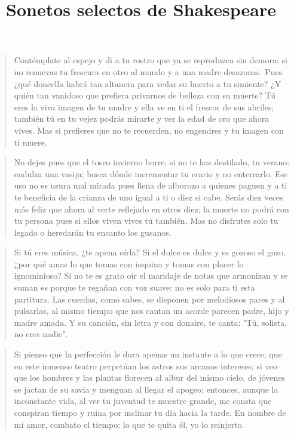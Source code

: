 \documentclass[12pt]{article}
\date{}
\title{Sonetos selectos de Shakespeare}
\begin{document}
\maketitle
\tableofcontents

\clearpage
{}
\begin{verse}
Contémplate al espejo y di a tu rostro  
que ya se reproduzca sin demora;  
si no renuevas tu frescura en otro  
al mundo y a una madre desazonas.  
Pues ¿qué doncella habrá tan altanera  
para vedar su huerto a tu simiente?  
¿Y quién tan vanidoso que prefiera  
privarnos de belleza con su muerte?  
Tú eres la viva imagen de tu madre  
y ella ve en ti el frescor de sus abriles;  
también tú en tu vejez podrás mirarte  
y ver la edad de oro que ahora vives.  
Mas si prefieres que no te recuerden,  
no engendres y tu imagen con ti muere.

\end{verse}

\clearpage
{}
\begin{verse}
No dejes pues que el tosco invierno borre,  
si no te has destilado, tu verano:  
endulza una vasija; busca dónde  
incrementar tu erario y no enterrarlo.  
Ese uso no es usura mal mirada  
pues llena de alborozo a quienes paguen  
y a ti te beneficia de la crianza  
de uno igual a ti o diez si cabe.   
Serás diez veces más feliz que ahora  
al verte reflejado en otros diez;  
la muerte no podrá con tu persona  
pues si ellos viven vives tú también.   
Mas no disfrutes solo tu legado  
o heredarán tu encanto los gusanos. 

\end{verse}

\clearpage
{}
\begin{verse}
Si tú eres música, ¿te apena oírla?  
Si el dulce es dulce y es gozoso el gozo,  
¿por qué amas lo que tomas con inquina  
y tomas con placer lo ignominioso?  
Si no te es grato oír el maridaje  
de notas que armonizan y se suman  
es porque te regañan con voz suave:  
no es solo para ti esta partitura.  
Las cuerdas, como sabes, se disponen  
por melodiosos pares y al pulsarlas,  
al mismo tiempo que nos cantan un acorde  
parecen padre, hijo y madre amada.  
Y su canción, sin letra y con donaire,  
te canta: "Tú, solista, no eres nadie".

\end{verse}

\clearpage
{}
\begin{verse}
Si pienso que la perfección le dura  
apenas un instante a lo que crece;  
que en este inmenso teatro perpetúan  
los astros sus arcanos intereses;  
si veo que los hombres y las plantas  
florecen al albur del mismo cielo,  
de jóvenes se jactan de su savia  
y menguan al llegar el apogeo;  
entonces, aunque la inconstante vida,  
al ver tu juventud te muestre grande,  
me consta que conspiran tiempo y ruina  
por inclinar tu día hacia la tarde.  
En nombre de mi amor, combato el tiempo:  
lo que te quita él, yo lo reinjerto.

\end{verse}
\end{document}
